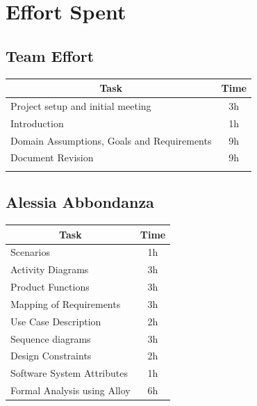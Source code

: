 \documentclass[12pt]{report}
\begin{document}
\chapter{Effort Spent}
\section{Team Effort}
\begin{table}[h]
\centering
\begin{tabular}{lc}
\hline
\multicolumn{1}{|c|}{Task}                                       & \multicolumn{1}{c|}{Time} \\ \hline
\multicolumn{1}{|l|}{Project setup and initial meeting}          & \multicolumn{1}{c|}{3h}    \\ \hline
\multicolumn{1}{|l|}{Introduction}                               & \multicolumn{1}{c|}{1h}    \\ \hline
\multicolumn{1}{|l|}{Domain Assumptions, Goals and Requirements} & \multicolumn{1}{c|}{9h}    \\ \hline
\multicolumn{1}{|l|}{Document Revision}                          & \multicolumn{1}{c|}{9h}    \\ \hline
& \multicolumn{1}{l}{}     
\end{tabular}
\end{table}
\section{Alessia Abbondanza}
\begin{table}[h]
\centering
\begin{tabular}{|l|c|}
\hline
\multicolumn{1}{|c|}{Task}      & Time \\ \hline
Scenarios                       & 1h    \\ \hline
Activity Diagrams               & 3h    \\ \hline
Product Functions               & 3h    \\ \hline
Mapping of Requirements         & 3h    \\ \hline
Use Case Description            & 2h    \\ \hline
Sequence diagrams               & 3h    \\ \hline
Design Constraints              & 2h    \\ \hline
Software System Attributes      & 1h    \\ \hline
Formal Analysis using Alloy     & 6h    \\ \hline
\end{tabular}
\end{table}
\clearpage
\end{document}
